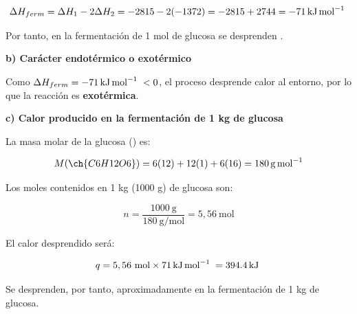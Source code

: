 \begin{exerciseEVAU}
\begin{solu}
        \begin{equation*}
            \Delta H_{ferm} = \Delta H_1 - 2 \Delta H_2 = -2815 - 2(-1372) = -2815 + 2744 = \energia[kjmol]{-71}
        \end{equation*}

        Por tanto, en la fermentación de 1 mol de glucosa se desprenden .

        \textbf{b) Carácter endotérmico o exotérmico}

        Como \(\Delta H_{ferm} = \energia[kjmol]{-71} < 0\), el proceso desprende calor al entorno, por lo que la reacción es \textbf{exotérmica}.

        \textbf{c) Calor producido en la fermentación de 1 kg de glucosa}

        La masa molar de la glucosa () es:

        \begin{equation*}
            M(\ch{C6H12O6}) = 6(12) + 12(1) + 6(16) = \SI{180}{\gram\per\mole}
        \end{equation*}

        Los moles contenidos en 1 kg (1000 g) de glucosa son:

        \begin{equation*}
            n = \dfrac{1000 \ \si{\gram}}{180 \ \si{\gram\per\mole}} = 5,56 \ \text{mol}
        \end{equation*}

        El calor desprendido será:

        \begin{equation*}
            q = 5,56 \ \text{mol} \times \energia[kjmol]{71} = \energia[kj]{394.4}
        \end{equation*}

        Se desprenden, por tanto, aproximadamente  en la fermentación de 1 kg de glucosa.

    \end{solu}
\end{exerciseEVAU}


